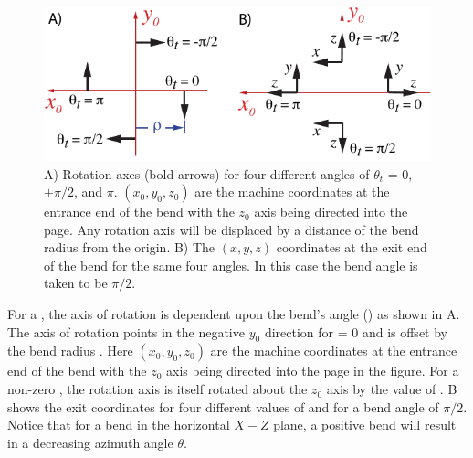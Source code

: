 
\begin{figure}
\centering \includegraphics{tilt-bend.pdf} 
\caption[Orientation of a Bend.] 
  {
A) Rotation axes (bold arrows) for four different  angles of $\theta_t$ = 0, $\pm
\pi/2$, and $\pi$. $(x_0, y_0, z_0)$ are the machine coordinates at the entrance end of the bend with
the $z_0$ axis being directed into the page. Any rotation axis will be displaced by a distance of
the bend radius  from the origin. B) The $(x, y, z)$ coordinates at the exit end of the bend
for the same four  angles. In this case the bend angle is taken to be $\pi/2$.
  }
  \label{f:tilt.bend}
\end{figure}


For a , the axis of rotation is dependent upon the bend's  angle
() as shown in A. The axis of rotation points in the negative $y_0$
direction for  = 0 and is offset by the bend radius . Here $(x_0, y_0, z_0)$
are the machine coordinates at the entrance end of the bend with the $z_0$ axis being directed into
the page in the figure.  For a non-zero , the rotation axis is itself rotated about the
$z_0$ axis by the value of . B shows the exit coordinates for four
different values of  and for a bend angle  of $\pi/2$.  Notice that for a
bend in the horizontal $X-Z$ plane, a positive bend  will result in a decreasing azimuth
angle $\theta$.


